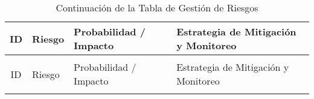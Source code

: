   {\small
    \begin{longtable}[c]{c p{5.8cm} >{\centering\arraybackslash}p{2cm} p{5.8cm}}
      \toprule
      ID   & \centering Riesgo                                                                                                                                                                                                                                                 & Probabilidad / Impacto & Estrategia de Mitigación y Monitoreo                                                                                                                                                                                                                                                                                                                                                                                                                      \\
      \midrule
      \endfirsthead
      \caption{Continuación de la Tabla de Gestión de Riesgos}                                                                                                                                                                                                                                                                                                                                                                                                                                                                                                                                                                                                                                                                                                      \\
      \toprule
      ID   & \centering Riesgo                                                                                                                                                                                                                                                 & Probabilidad / Impacto & Estrategia de Mitigación y Monitoreo                                                                                                                                                                                                                                                                                                                                                                                                                      \\
      \midrule
      \endhead
      \endfoot
      \endlastfoot


\end{longtable}}
